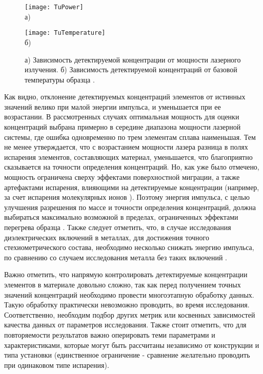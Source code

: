 \begin{figure}[htb]
	\begin{minipage}[b]{0.49\textwidth}\centering
		\texttt{[image: TuPower]} \\ а)
	\end{minipage}
	\begin{minipage}[b]{0.49\textwidth}\centering
		\texttt{[image: TuTemperature]} \\ б)
	\end{minipage}
	\caption{а) Зависимость детектируемой концентрации от мощности лазерного излучения. б) Зависимость детектируемой концентраций от базовой температуры образца \cite{Tu15}.}
	\label{fig:TuComposition}
\end{figure}

Как видно, отклонение детектируемых концентраций элементов от истинных значений велико при малой энергии импульса, и уменьшается при ее возрастании. В рассмотренных случаях оптимальная мощность для оценки концентраций выбрана примерно в середине диапазона мощности лазерной системы, где ошибка одновременно по трем элементам сплава наименьшая. Тем не менее утверждается, что с возрастанием мощности лазера разница в полях испарения элементов, составляющих материал, уменьшается, что благоприятно сказывается на точности определения концентраций. Но, как уже было отмечено, мощность ограничена сверху эффектами поверхностной миграции, а также артефактами испарения, влияющими на детектируемые концентрации (например, за счет испарения молекулярных ионов \cite{Tu15}). Поэтому энергия импульса, с целью улучшения разрешения по массе и точности определения концентраций, должна выбираться максимально возможной в пределах, ограниченных эффектами перегрева образца \cite{Tu15}. Также следует отметить, что, в случае исследования диэлектрических включений в металлах, для достижения точного стехиометрического состава, необходимо несколько снижать энергию импульса, по сравнению со случаем исследования металла без таких включений \cite{LarsonBOOK}.


Важно отметить, что напрямую контролировать детектируемые концентрации элементов в материале довольно сложно, так как перед получением точных значений концентраций необходимо провести многоэтапную обработку данных. Такую обработку практически невозможно проводить, во время исследования. Соответственно, необходим подбор других метрик или косвенных зависимостей качества данных от параметров исследования. Также стоит отметить, что для повторяемости результатов важно оперировать теми параметрами и характеристиками, которые могут быть рассчитаны независимо от конструкции и типа установки (единственное ограничение - сравнение желательно проводить при одинаковом типе испарения).

